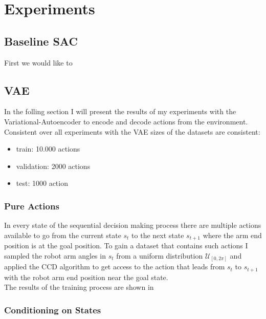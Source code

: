 \chapter{Experiments}\label{chap:experiments}

% 
% 



\section{Baseline SAC}

First we would like to 




\section{VAE}

In the folling section I will present the results of my experiments with the Variational-Autoencoder to encode and decode actions from the environment.
Consistent over all experiments with the VAE sizes of the datasets are consistent:
\begin{itemize}
    \item train: 10.000 actions
    \item validation: 2000 actions
    \item test: 1000 action
\end{itemize}


\subsection{Pure Actions}

In every state of the sequential decision making process there are multiple actions available to go from the current state $s_t$ to the next state $s_{t+1}$ where the arm end position is at the goal position. To gain a dataset that contains such actions I sampled the robot arm angles in $s_t$ from a uniform distribution $\mathcal{U}_[0, 2\pi]$ and applied the CCD algorithm to get access to the action that leads from $s_t$ to $s_{t+1}$ with the robot arm end position near the goal state.\\

The results of the training process are shown in \figref{}

\subsection{Conditioning on States}


